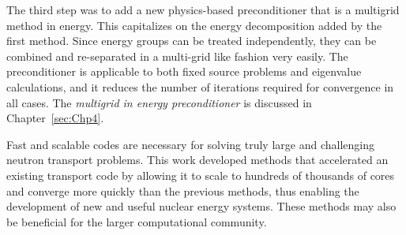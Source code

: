 The third step was to add a new physics-based preconditioner that is a multigrid method in energy. This capitalizes on the energy decomposition added by the first method. Since energy groups can be treated independently, they can be combined and re-separated in a multi-grid like fashion very easily. The preconditioner is applicable to both fixed source problems and eigenvalue calculations, and it reduces the number of iterations required for convergence in all cases. The \emph{multigrid in energy preconditioner} is discussed in Chapter~\ref{sec:Chp4}.

Fast and scalable codes are necessary for solving truly large and challenging neutron transport problems. This work developed methods that accelerated an existing transport code by allowing it to scale to hundreds of thousands of cores and converge more quickly than the previous methods, thus enabling the development of new and useful nuclear energy systems. These methods may also be beneficial for the larger computational community.  
